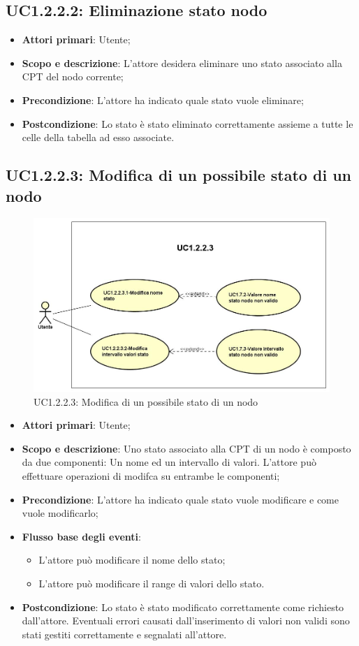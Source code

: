 \subsection{UC1.2.2.2: Eliminazione stato nodo} 
\begin{itemize} 
	\item{\textbf{Attori primari}: Utente;} 
	\item{\textbf{Scopo e descrizione}: L'attore desidera eliminare uno stato associato alla CPT del nodo corrente;} 
	\item{\textbf{Precondizione}: L'attore ha indicato quale stato vuole eliminare;} 
	\item{\textbf{Postcondizione}: Lo stato è stato eliminato correttamente assieme a tutte le celle della tabella ad esso associate.} 
\end{itemize} 
\subsection{UC1.2.2.3: Modifica di un possibile stato di un nodo} 
\begin{figure} [H]
	\centering
	\includegraphics[scale=0.45]{Img/UC1-2-2-3} 
	\caption{UC1.2.2.3: Modifica di un possibile stato di un nodo} \label{} 
\end{figure} 
\begin{itemize} 
	\item{\textbf{Attori primari}: Utente;} 
	\item{\textbf{Scopo e descrizione}: Uno stato associato alla CPT di un nodo è composto da due componenti: Un nome ed un intervallo di valori. L'attore può effettuare operazioni di modifca su entrambe le componenti;} 
	\item{\textbf{Precondizione}: L'attore ha indicato quale stato vuole modificare e come vuole modificarlo;} 
	\item{\textbf{Flusso base degli eventi}: 
		\begin{itemize} 
			\item{L'attore può modificare il nome dello stato;} 
			\item{L'attore può modificare il range di valori dello stato.} 
		\end{itemize} 			
	} 
	\item{\textbf{Postcondizione}: Lo stato è stato modificato correttamente come richiesto dall'attore. Eventuali errori causati dall'inserimento di valori non validi sono stati gestiti correttamente e segnalati all'attore.} 
\end{itemize} 
